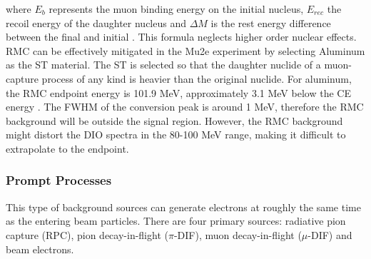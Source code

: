 where $E_b$ represents the muon binding energy on the initial nucleus, $E_{rec}$  
the recoil energy of the daughter nucleus and $\Delta M$ is the rest energy difference 
between the final and initial . This formula neglects higher order nuclear effects. 
RMC can be effectively mitigated in the Mu2e experiment by 
selecting Aluminum as the ST material. The ST is selected so that the daughter nuclide of a muon-capture 
process of any kind is heavier than the original nuclide. For aluminum, the RMC 
endpoint energy is 101.9 MeV, approximately 3.1 MeV below the CE energy 
\cite{bartoszek2015mu2e}. 
The  FWHM of the conversion peak is around 1 MeV, therefore the RMC background will be 
outside the signal region. However, the RMC background might distort the DIO spectra 
in the 80-100 MeV 
range, making it difficult to extrapolate to the endpoint.

\subsubsection{Prompt Processes}
This type of background sources can generate electrons at roughly the same time as 
the entering beam particles. There are four primary sources: radiative pion capture (RPC), 
pion decay-in-flight ($\pi$-DIF), muon decay-in-flight ($\mu$-DIF) and beam electrons.

